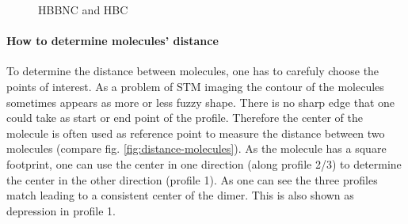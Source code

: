 \begin{figure}[]\centering
	\caption{ HBBNC and  HBC}
	\label{fig:HBBNC+HBC}
\end{figure}
\paragraph{How to determine molecules' distance}
To determine the distance between molecules, one has to carefuly choose the points of interest. As a problem of STM imaging the contour of the molecules sometimes appears as more or less fuzzy shape. There is no sharp edge that one could take as start or end point of the profile. Therefore the center of the molecule is often used as reference point to measure the distance between two molecules (compare fig. \ref{fig:distance-molecules}). As the molecule has a square footprint, one can use the center in one direction (along profile 2/3) to determine the center in the other direction (profile 1). As one can see the three profiles match leading to a consistent center of the dimer. This is also shown as depression in profile 1. 

